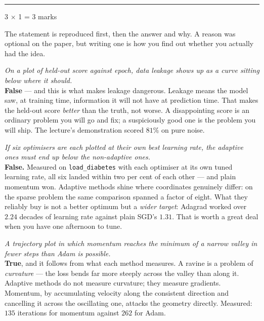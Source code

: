 \documentclass[10pt,a4paper]{article}
\newcommand{\parthead}[2]{\vspace{2pt}\noindent\rule{\linewidth}{0.4pt}\par\vspace{2pt}%
  \noindent{\bfseries Part #1}\hfill{\small #2}\par\vspace{1pt}}
\begin{document}
\newpage

\parthead{C --- True or false}{3 $\times$ 1 = 3 marks}

{\small The statement is reproduced first, then the answer and why. A reason was optional on the paper, but writing one is how you find out whether you actually had the idea.}

\begin{sC}

  \item \emph{On a plot of held-out score against epoch, data leakage shows up as a curve sitting \emph{below} where it should.}\\[2pt] \textbf{False} --- and this is what makes leakage dangerous. Leakage means the model saw, at training time, information it will not have at prediction time. That makes the held-out score \emph{better} than the truth, not worse. A disappointing score is an ordinary problem you will go and fix; a suspiciously good one is the problem you will ship. The lecture's demonstration scored $81\%$ on pure noise.

  \item \emph{If six optimisers are each plotted at their own best learning rate, the adaptive ones must end up below the non-adaptive ones.}\\[2pt] \textbf{False.} Measured on \texttt{load\_diabetes} with each optimiser at its own tuned learning rate, all six landed within two per cent of each other --- and plain momentum won. Adaptive methods shine where coordinates genuinely differ: on the sparse problem the same comparison spanned a factor of eight. What they reliably buy is not a better optimum but a \emph{wider target}: Adagrad worked over $2.24$ decades of learning rate against plain SGD's $1.31$. That is worth a great deal when you have one afternoon to tune.

  \item \emph{A trajectory plot in which momentum reaches the minimum of a narrow valley in fewer steps than Adam is possible.}\\[2pt] \textbf{True}, and it follows from what each method measures. A ravine is a problem of \emph{curvature} --- the loss bends far more steeply across the valley than along it. Adaptive methods do not measure curvature; they measure gradients. Momentum, by accumulating velocity along the consistent direction and cancelling it across the oscillating one, attacks the geometry directly. Measured: $135$ iterations for momentum against $262$ for Adam.

\end{sC}
\end{document}
